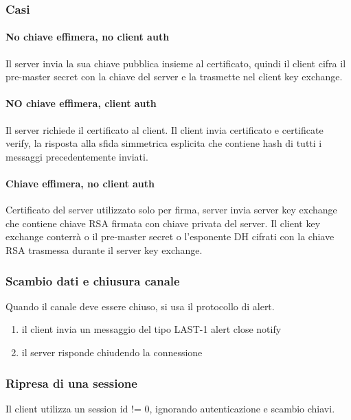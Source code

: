 \documentclass[11pt]{article}
\begin{document}
\subsubsection{Casi}
\paragraph*{No chiave effimera, no client auth}
Il server invia la sua chiave pubblica insieme al certificato, quindi il client cifra il pre-master secret con la chiave 
del server e la trasmette nel client key exchange. 
\paragraph*{NO chiave effimera, client auth}
Il server richiede il certificato al client. Il client invia certificato e certificate verify, la risposta alla sfida 
simmetrica esplicita che contiene hash di tutti i messaggi precedentemente inviati.
\paragraph*{Chiave effimera, no client auth}
Certificato del server utilizzato solo per firma, server invia server key exchange che contiene chiave RSA firmata con chiave
privata del server. Il client key exchange conterrà o il pre-master secret o l'esponente DH cifrati con la chiave RSA 
trasmessa durante il server key exchange.
\subsubsection{Scambio dati e chiusura canale}
Quando il canale deve essere chiuso, si usa il protocollo di alert. 
\begin{enumerate}
    \item il client invia un messaggio del tipo LAST-1 alert close notify 
    \item il server risponde chiudendo la connessione 
\end{enumerate}
\subsubsection{Ripresa di una sessione}
Il client utilizza un session id != 0, ignorando autenticazione e scambio chiavi.
\end{document}
